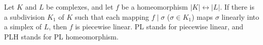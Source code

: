 Let $K$ and $L$ be complexes, and let $f$ be a homeomorphism $|K| \leftrightarrow |L|$. If there is a subdivision $K_1$ of $K$ such that each mapping $f \mid \sigma$ ($\sigma \in K_1$) maps $\sigma$ linearly into a simplex of $L$, then $f$ is piecewise linear. PL stands for piecewise linear, and PLH stands for PL homeomorphism.
